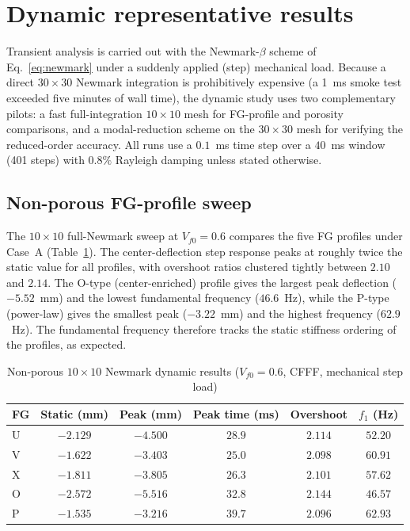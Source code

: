 \documentclass[11pt,a4paper]{article}
\begin{document}
\section{Dynamic representative results}

Transient analysis is carried out with the Newmark-$\beta$ scheme of Eq.~\eqref{eq:newmark} under a suddenly applied (step) mechanical load. Because a direct $30\times30$ Newmark integration is prohibitively expensive (a 1~ms smoke test exceeded five minutes of wall time), the dynamic study uses two complementary pilots: a fast full-integration $10\times10$ mesh for FG-profile and porosity comparisons, and a modal-reduction scheme on the $30\times30$ mesh for verifying the reduced-order accuracy. All runs use a $0.1$~ms time step over a $40$~ms window (401 steps) with $0.8\%$ Rayleigh damping unless stated otherwise.

\subsection{Non-porous FG-profile sweep}

The $10\times10$ full-Newmark sweep at $V_{f0}=0.6$ compares the five FG profiles under Case~A (Table~\ref{tab:dyn-fg}). The center-deflection step response peaks at roughly twice the static value for all profiles, with overshoot ratios clustered tightly between $2.10$ and $2.14$. The O-type (center-enriched) profile gives the largest peak deflection ($-5.52$~mm) and the lowest fundamental frequency ($46.6$~Hz), while the P-type (power-law) gives the smallest peak ($-3.22$~mm) and the highest frequency ($62.9$~Hz). The fundamental frequency therefore tracks the static stiffness ordering of the profiles, as expected.

\begin{table}[H]
\centering
\caption{Non-porous $10\times10$ Newmark dynamic results ($V_{f0}=0.6$, CFFF, mechanical step load)}
\label{tab:dyn-fg}
\begin{tabular}{lccccc}
\toprule
\textbf{FG} & \textbf{Static (mm)} & \textbf{Peak (mm)} & \textbf{Peak time (ms)} & \textbf{Overshoot} & \textbf{$f_1$ (Hz)} \\
\midrule
U & $-2.129$ & $-4.500$ & $28.9$ & $2.114$ & $52.20$ \\
V & $-1.622$ & $-3.403$ & $25.0$ & $2.098$ & $60.91$ \\
X & $-1.811$ & $-3.805$ & $26.3$ & $2.101$ & $57.62$ \\
O & $-2.572$ & $-5.516$ & $32.8$ & $2.144$ & $46.57$ \\
P & $-1.535$ & $-3.216$ & $39.7$ & $2.096$ & $62.93$ \\
\bottomrule
\end{tabular}
\end{table}
\end{document}
